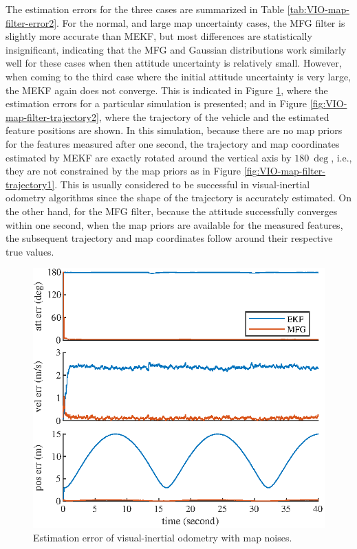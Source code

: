 The estimation errors for the three cases are summarized in Table \ref{tab:VIO-map-filter-error2}.
For the normal, and large map uncertainty cases, the MFG filter is slightly more accurate than MEKF, but most differences are statistically insignificant, indicating that the MFG and Gaussian distributions work similarly well for these cases when then attitude uncertainty is relatively small.
However, when coming to the third case where the initial attitude uncertainty is very large, the MEKF again does not converge.
This is indicated in Figure \ref{fig:VIO-map-filter-error2}, where the estimation errors for a particular simulation is presented; and in Figure \ref{fig:VIO-map-filter-trajectory2}, where the trajectory of the vehicle and the estimated feature positions are shown.
In this simulation, because there are no map priors for the features measured after one second, the trajectory and map coordinates estimated by MEKF are exactly rotated around the vertical axis by $\SI{180}{\deg}$, i.e., they are not constrained by the map priors as in Figure \ref{fig:VIO-map-filter-trajectory1}.
This is usually considered to be successful in visual-inertial odometry algorithms since the shape of the trajectory is accurately estimated.
On the other hand, for the MFG filter, because the attitude successfully converges within one second, when the map priors are available for the measured features, the subsequent trajectory and map coordinates follow around their respective true values.

\begin{figure}
	\centering
	\includegraphics[scale=1.3]{figures/VIO-map-filter-error2}
	\caption{Estimation error of visual-inertial odometry with map noises.}
	\label{fig:VIO-map-filter-error2}
\end{figure}

